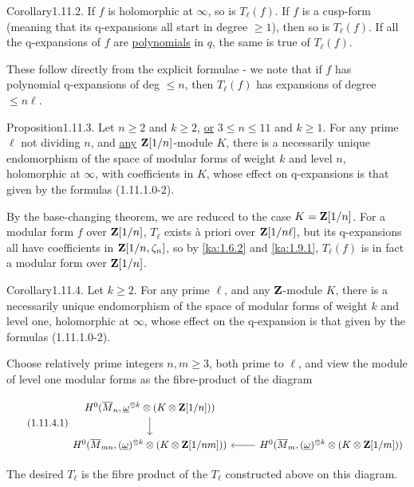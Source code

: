 \begin{kathm}{Corollary}{1.11.2.}
If $f$ is holomorphic at $\infty$, so is $T_\ell(f)$. If $f$ is a cusp-form
(meaning that its q-expansions all start in degree $\geq 1$), then so is
$T_\ell(f)$. If all the q-expansions of $f$ are \uline{polynomials} in $q$, the
same is true of $T_\ell(f)$.
\end{kathm}

\begin{kaproof}
These follow directly from the explicit formulae - we note that if $f$ has
polynomial q-expansions of deg $\leq n$, then $T_\ell(f)$ has expansions of
degree $\leq n\ell$.
\end{kaproof}

\begin{kathm}{Proposition}{1.11.3.}
Let $n\geq 2$ and $k\geq 2$, \uline{or} $3\leq n\leq 11$ and $k\geq 1$. For any
prime $\ell$ not dividing $n$, and \uline{any} $\mathbf{Z}[1/n]$-module $K$, there is a
necessarily unique endomorphism of the space of modular forms of weight $k$ and
level $n$, holomorphic at $\infty$, with coefficients in $K$, whose effect on
q-expansions is that given by the formulas (1.11.1.0-2).
\end{kathm}

\begin{kaproof}
By the base-changing theorem, we are reduced to the case $K = \mathbf{Z}[1/n]$. For a
modular form $f$ over $\mathbf{Z}[1/n]$, $T_\ell$ exists à priori over $\mathbf{Z}[1/n\ell]$,
but its q-expansions all have coefficients in $\mathbf{Z}[1/n,\zeta_n]$, so by \eqref{ka:1.6.2}
and \eqref{ka:1.9.1}, $T_\ell(f)$ is in fact a modular form over $\mathbf{Z}[1/n]$.
\end{kaproof}

\begin{kathm}{Corollary}{1.11.4.}
Let $k\geq 2$. For any prime $\ell$, and any $\mathbf{Z}$-module $K$, there is a
necessarily unique endomorphism of the space of modular forms of weight $k$ and
level one, holomorphic at $\infty$, whose effect on the q-expansion is that
given by the formulas (1.11.1.0-2).
\end{kathm}

\begin{kaproof}
Choose relatively prime integers $n,m\geq 3$, both prime to $\ell$, and view the
module of level one modular forms as the fibre-product of the diagram

\begin{equation}\tag{1.11.4.1}\label{ka:1.11.4.1}
\begin{tikzcd}
H^0(\Mbar_n,\w^{\otimes k}\tens(K\tens\Z[1/n])) \arrow[d] \\
H^0(\Mbar_{mn},(\w)^{\otimes k}\tens(K\tens\Z[1/nm])) & H^0(\Mbar_m,(\w)^{\otimes k}\tens(K\tens\Z[1/m])) \arrow[l]
\end{tikzcd}
\end{equation}

The desired $T_\ell$ is the fibre product of the $T_\ell$ constructed above on
this diagram.
\end{kaproof}

